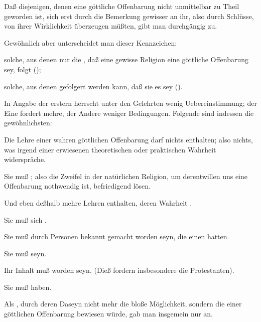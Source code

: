 \begin{aufza}
\item Daß diejenigen, denen eine göttliche Offenbarung nicht unmittelbar zu Theil geworden ist, sich erst durch die Bemerkung gewisser  an ihr, also durch Schlüsse, von ihrer Wirklichkeit überzeugen müßten, gibt man durchgängig zu.~
\item Gewöhnlich aber unterscheidet man  dieser Kennzeichen:
\begin{aufzb}
\item solche, aus denen nur die , daß eine gewisse Religion eine göttliche Offenbarung sey, folgt ();
\item solche, aus denen gefolgert werden kann, daß sie es  sey (). 
\end{aufzb}
\item In Angabe der erstern herrscht unter den Gelehrten wenig Uebereinstimmung; der Eine fordert mehre, der Andere weniger Bedingungen. Folgende sind indessen die gewöhnlichsten:
\begin{aufzb}
\item Die Lehre einer wahren göttlichen Offenbarung darf nichts  enthalten; also nichts, was irgend einer erwiesenen theoretischen oder praktischen Wahrheit widerspräche.
\item Sie muß ; also die Zweifel in der natürlichen Religion, um derentwillen uns eine Offenbarung nothwendig ist, befriedigend lösen.
\item Und eben deßhalb mehre Lehren enthalten, deren Wahrheit .
\item Sie muß sich .
\item Sie muß durch Personen bekannt gemacht worden seyn, die einen  hatten.
\item Sie muß  seyn.
\item Ihr Inhalt muß  worden seyn. (Dieß fordern insbesondere die Protestanten).
\item Sie muß  haben. 
\end{aufzb}
\item Als , durch deren Daseyn nicht mehr die bloße Möglichkeit, sondern die  einer göttlichen Offenbarung bewiesen würde, gab man insgemein nur  an.
\end{aufza}

